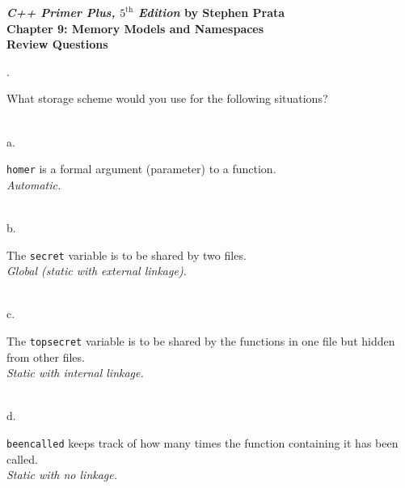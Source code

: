 \documentclass{amsart}
\begin{document}
\begin{center}
	\Large {\bfseries
	\emph{C++ Primer Plus, $5^{\text{th}}$ Edition} by Stephen Prata \\
	Chapter 9: Memory Models and Namespaces \\
	Review Questions} \normalsize \vspace{5ex}
\end{center}


. 
\begin{minipage}[t]{11.5 cm}
	What storage scheme would you use for the following situations?
\end{minipage} \\[1ex]
\phantom{1. }a.
\begin{minipage}[t]{11.5 cm}
	\verb+homer+ is a formal argument (parameter) to a function. \\[1ex]
	{\slshape Automatic.} \\
	{} %
\end{minipage} \\[1ex]
\phantom{1. }b.
\begin{minipage}[t]{11.5 cm}
	The \verb+secret+ variable is to be shared by two files. \\[1ex]
	{\slshape Global (static with external linkage).}\\
	{} %
\end{minipage} \\[1ex]
\phantom{1. }c.
\begin{minipage}[t]{11.5 cm}
	The \verb+topsecret+ variable is to be shared by the functions in one file but hidden from other files. \\[1ex]
	{\slshape Static with internal linkage.} \\
	{} %
\end{minipage} \\[1ex]
\phantom{1. }d.
\begin{minipage}[t]{11.5 cm}
	\verb+beencalled+ keeps track of how many times the function containing it has been called. \\[1ex]
	{\slshape Static with no linkage.} \\
	{} %
\end{minipage}
\vfill
\end{document}
